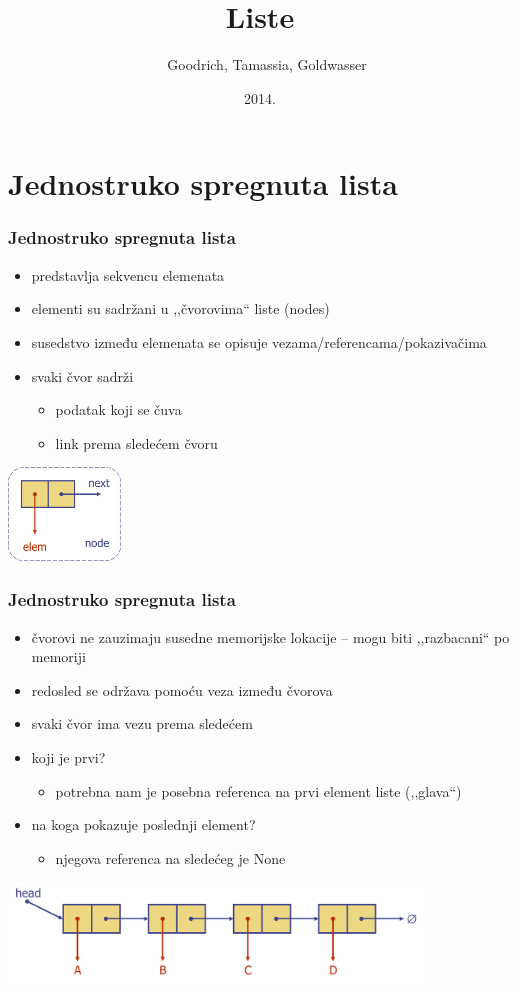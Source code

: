 \documentclass[compress]{beamer}
\title{Liste}
\author{\textcopyright \ \ Goodrich, Tamassia, Goldwasser}
\institute{Katedra za informatiku, Fakultet tehničkih nauka, Univerzitet u
Novom Sadu}
\date{2014.}
\begin{document}
\frame{\titlepage}

\section[1-Lista]{Jednostruko spregnuta lista}
\begin{frame}[fragile]
  \frametitle{Jednostruko spregnuta lista}
  \begin{itemize}
    \item predstavlja sekvencu elemenata
    \item elementi su sadržani u ,,čvorovima`` liste (nodes)
    \item susedstvo između elemenata se opisuje vezama/referencama/pokazivačima
    \item svaki čvor sadrži
    \begin{itemize}
      \item podatak koji se čuva
      \item link prema sledećem čvoru
    \end{itemize}
  \end{itemize}
  \begin{center}
    \includegraphics[width=3cm]{asp-07-pic01.png}
  \end{center}
\end{frame}

\begin{frame}[fragile]
  \frametitle{Jednostruko spregnuta lista}
  \begin{itemize}
    \item čvorovi ne zauzimaju susedne memorijske lokacije -- mogu biti ,,razbacani`` po memoriji
    \item redosled se održava pomoću veza između čvorova
    \item svaki čvor ima vezu prema sledećem
    \item koji je prvi?
    \begin{itemize}
      \item potrebna nam je posebna referenca na prvi element liste (,,glava``)
    \end{itemize}
    \item na koga pokazuje poslednji element?
    \begin{itemize}
      \item njegova referenca na sledećeg je None
    \end{itemize}
  \end{itemize}
  \begin{center}
    \includegraphics[width=11cm]{asp-07-pic02.png}
  \end{center}
\end{frame}
\end{document}
